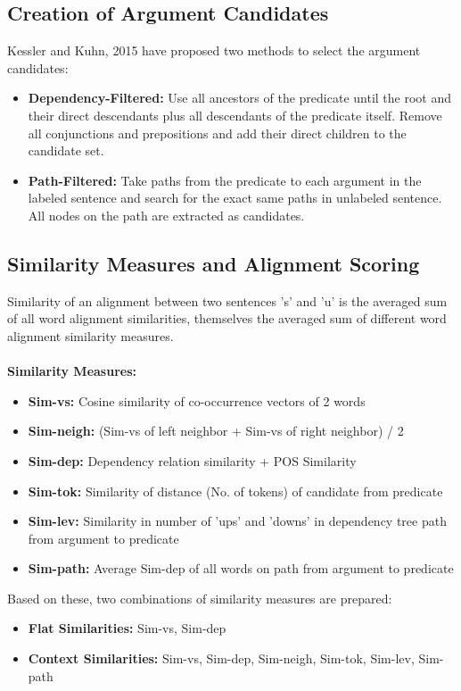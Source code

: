\documentclass[12pt]{article}
\begin{document}
\subsection{Creation of Argument Candidates}
Kessler and Kuhn, 2015 have proposed two methods to select the argument candidates:
\begin{itemize}
\item \textbf{Dependency-Filtered: }Use all ancestors of the predicate until the root and their direct descendants plus all descendants of the predicate itself. Remove all conjunctions and prepositions and add their direct children to the candidate set.
\item \textbf{Path-Filtered: }Take paths from the predicate to each argument in the labeled sentence and search for the exact same paths in unlabeled sentence. All nodes on the path are extracted as candidates.
\end{itemize}

\subsection{Similarity Measures and Alignment Scoring}
Similarity of an alignment between two sentences 's' and 'u' is the averaged sum of all word alignment similarities, themselves the averaged sum of different word alignment similarity measures.\\\\
\textbf{Similarity Measures:}
\begin{itemize}
\item \textbf{Sim-vs:} Cosine similarity of co-occurrence vectors of 2 words
\item \textbf{Sim-neigh:} (Sim-vs of left neighbor + Sim-vs of right neighbor) / 2
\item \textbf{Sim-dep:} Dependency relation similarity + POS Similarity
\item \textbf{Sim-tok:} Similarity of distance (No. of tokens) of candidate from predicate
\item \textbf{Sim-lev:} Similarity in number of 'ups' and 'downs' in dependency tree path from argument to predicate
\item \textbf{Sim-path:} Average Sim-dep of all words on path from argument to predicate
\end{itemize}
Based on these, two combinations of similarity measures are prepared:
\begin{itemize}
\item \textbf {Flat Similarities: } Sim-vs, Sim-dep
\item \textbf {Context Similarities: } Sim-vs, Sim-dep, Sim-neigh, Sim-tok, Sim-lev, Sim-path
\end{itemize}
\end{document}
